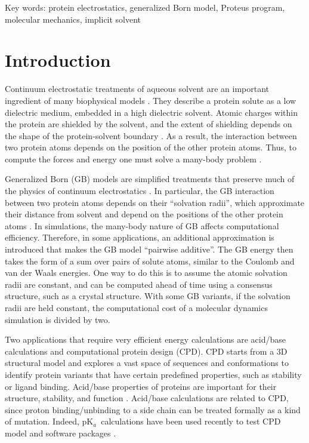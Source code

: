 \documentclass[a4paper,12pt]{article}
\newcommand{\pk}{pK$_a$}
\begin{document}
\vfill
Key words: protein electrostatics, generalized Born model, Proteus program, molecular mechanics,
implicit solvent

\parindent 8mm

\clearpage
\pagebreak

\section{Introduction}
Continuum electrostatic treatments of aqueous solvent \cite{FrohlichBK} are an important ingredient of many biophysical
models \cite{Schaefer98b,Kollman00,Simonson03,Baker05a}. They describe a protein solute as a low dielectric medium,
embedded in a high dielectric solvent. Atomic charges within the protein are shielded by the solvent, and the extent
of shielding depends on the shape of the protein-solvent boundary \cite{Shaw85,Zauhar85}. As a result, the interaction
between two protein atoms depends on the position of the other protein atoms. Thus, to compute the forces and energy
one must solve a many-body problem \cite{Schaefer90,Gilson93,Im98}.

Generalized Born (GB) models are simplified treatments that preserve much of the physics of continuum electrostatics
\cite{Still90,Bashford00,Feig04b}. In particular, the GB interaction between two protein atoms depends on their
``solvation radii'', which approximate their distance from solvent and depend on the positions of the other protein
atoms \cite{Hawkins95,Qiu97,Schaefer96,Lee02}. In simulations, the many-body nature of GB affects computational efficiency.
Therefore, in some applications, an additional approximation is introduced that makes the GB model ``pairwise additive''.
The GB energy then takes the form of a sum over pairs of solute atoms, similar to the Coulomb and van der Waals energies.
One way to do this is to assume the atomic solvation radii are constant, and can be computed ahead of time using a
consensus structure, such as a crystal structure. With some GB variants, if the solvation radii are held constant, the
computational cost of a molecular dynamics simulation is divided by two.

Two applications that require very efficient energy calculations are acid/base calculations and computational protein
design (CPD). CPD starts from a 3D structural model and explores a vast space of sequences and conformations to identify
protein variants that have certain predefined properties, such as stability or ligand binding. Acid/base properties of
proteins are important for their structure, stability, and function \cite{FershtBK,Onufriev13}. Acid/base calculations
are related to CPD, since proton binding/unbinding to a side chain can be treated formally as a kind of mutation. Indeed,
\pk\ calculations have been used recently to test CPD model and software packages \cite{Barth07,Kilambi12,Polydorides13}.
\end{document}
